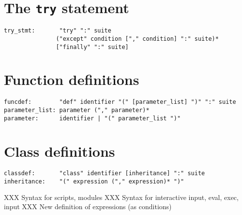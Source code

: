 \section{The {\tt try} statement}

\begin{verbatim}
try_stmt:       "try" ":" suite
               ("except" condition ["," condition] ":" suite)*
               ["finally" ":" suite]
\end{verbatim}

\section{Function definitions}

\begin{verbatim}
funcdef:        "def" identifier "(" [parameter_list] ")" ":" suite
parameter_list: parameter ("," parameter)*
parameter:      identifier | "(" parameter_list ")"
\end{verbatim}

\section{Class definitions}

\begin{verbatim}
classdef:       "class" identifier [inheritance] ":" suite
inheritance:    "(" expression ("," expression)* ")"
\end{verbatim}

XXX Syntax for scripts, modules
XXX Syntax for interactive input, eval, exec, input
XXX New definition of expressions (as conditions)


